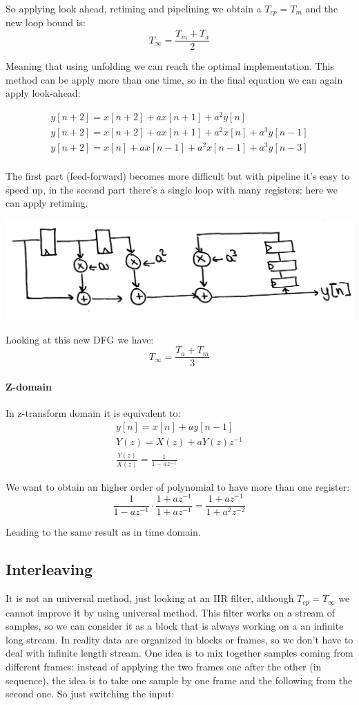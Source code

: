 So applying look ahead, retiming and pipelining we obtain a $T_{cp}=T_m$ and the new loop bound is:
$$T_\infty=\frac{T_m+T_a}{2}$$

Meaning that using unfolding we can reach the optimal implementation. This method can be apply more than one time, so in the final equation we can again apply look-ahead:

\begin{eqnarray}
y[n+2]=x[n+2]+ax[n+1]+a^2 y[n]\\
y[n+2]=x[n+2]+ax[n+1]+a^2 x[n]+a^3 y[n-1]\\
y[n+2]=x[n]+ax[n-1]+a^2 x[n-1]+a^3 y[n-3]\\
\end{eqnarray}

The first part (feed-forward) becomes more difficult but with pipeline it's easy to speed up, in the second part there's a single loop with many registers: here we can apply retiming.

\begin{center}
  \includegraphics[width=0.7\linewidth]{img/img1/46}
\end{center}

Looking at this new DFG we have:
$$T_{\infty}=\frac{T_a+T_m}{3}$$

\paragraph{Z-domain}
In z-transform domain it is equivalent to:
\begin{eqnarray}
y[n]=x[n]+ay[n-1]\\
Y(z)=X(z)+aY(z) z^{-1}\\
\frac{Y(z)}{X(z)}= \frac{1}{1-az^{-1}}
\end{eqnarray}

We want to obtain an higher order of polynomial to have more than one register:
$$\frac{1}{1-az^{-1}} \cdot \frac{1+az^{-1}}{1+az^{-1}} = \frac{1+az^{-1}}{1+a^2 z^{-2}}$$

Leading to the same result as in time domain.

\subsection{Interleaving}
It is not an universal method, just looking at an IIR filter, although $T_{cp}=T_\infty$ we cannot improve it by using universal method.
This filter works on a stream of samples, so we can consider it as a block that is always working on a an infinite long stream. In reality data are organized in blocks or frames, so we don't have to deal with infinite length stream. One idea is to mix together samples coming from different frames: instead of applying the two frames one after the other (in sequence), the idea is to take one sample by one frame and the following from the second one. So just switching the input:


